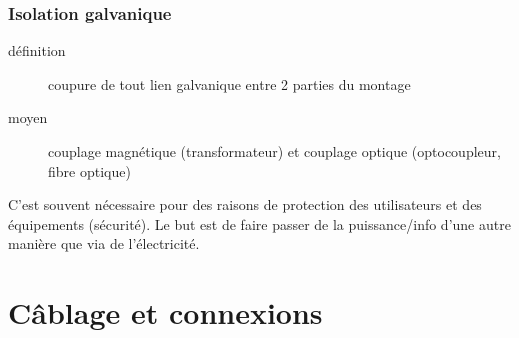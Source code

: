 \subsubsection{Isolation galvanique}
\begin{description}
	\item[définition] coupure de tout lien galvanique entre 2 parties du montage
	\item[moyen] couplage magnétique (transformateur) et couplage optique (optocoupleur, fibre optique)
\end{description}
C'est souvent nécessaire pour des raisons de protection des utilisateurs et des équipements (sécurité). Le but est de faire passer de la puissance/info d'une autre manière que via de l'électricité.

\section{Câblage et connexions}
